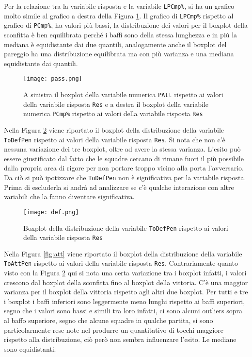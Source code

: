 Per la relazione tra la variabile risposta e la variabile \texttt{LPCmp\%}, si ha un grafico molto simile al grafico a destra della Figura \ref{fig:pass}. Il grafico di \texttt{LPCmp\%} rispetto al grafico di \texttt{PCmp\%}, ha valori più bassi, la distribuzione dei valori per il boxplot della sconfitta è ben equilibrata perché i baffi sono della stessa lunghezza e in più la mediana è equidistante dai due quantili, analogamente anche il boxplot del pareggio ha una distribuzione equilibrata ma con più varianza e una mediana equidistante dai quantili.\\

\begin{figure}[htbp]
	\begin{center}
		\texttt{[image: pass.png]}
		\caption{A sinistra il boxplot della variabile numerica \texttt{PAtt} rispetto ai valori della variabile risposta \texttt{Res} e a destra il boxplot della variabile numerica \texttt{PCmp\%} rispetto ai valori della variabile risposta \texttt{Res}} \label{fig:pass}
	\end{center}
\end{figure}

Nella Figura \ref{fig:defp} viene riportato il boxplot della distribuzione della variabile \texttt{ToDefPen} rispetto ai valori della variabile risposta \texttt{Res}. Si nota che non c'è nessuna variazione dei tre boxplot, oltre ad avere la stessa varianza. L'esito può essere giustificato dal fatto che le squadre cercano di rimane fuori il più possibile dalla propria area di rigore per non portare troppo vicino alla porta l'avversario. Da ciò si può ipotizzare che \texttt{ToDefPen} non è significativa per la variabile risposta. Prima di escluderla si andrà ad analizzare se c'è qualche interazione con altre variabili che la fanno diventare significativa.\\

\begin{figure}[htbp]
	\begin{center}
		\texttt{[image: def.png]}
		\caption{Boxplot della distribuzione della variabile \texttt{ToDefPen} rispetto ai valori della variabile risposta \texttt{Res} } \label{fig:defp}
	\end{center}
\end{figure}

Nella Figura \ref{fig:att} viene riportato il boxplot della distribuzione della variabile \texttt{ToAttPen} rispetto ai valori della variabile risposta \texttt{Res}. Contrariamente quanto visto con la Figura \ref{fig:defp} qui si nota una certa variazione tra i boxplot infatti, i valori crescono dal boxplot della sconfitta fino al boxplot della vittoria. C'è una maggior varianza per il boxplot della vittoria rispetto agli altri due boxplot. Per tutti e tre i boxplot i baffi inferiori sono leggermente meno lunghi rispetto ai baffi superiori, segno che i valori sono bassi e simili tra loro infatti, ci sono alcuni outliers sopra al baffo superiore, segno che alcune squadre in qualche partita, si sono particolarmente rese note nel produrre un quantitativo di tocchi maggiore rispetto alla distribuzione, ciò però non sembra influenzare l'esito. Le mediane sono equidistanti.\\

